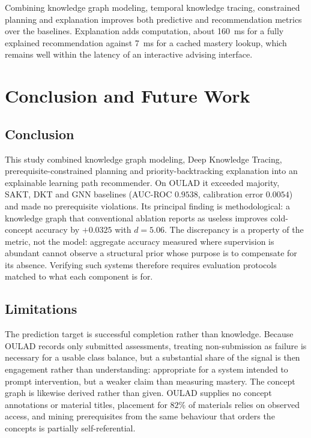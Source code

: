 \documentclass[graybox]{SNmult}
\begin{document}
Combining knowledge graph modeling, temporal knowledge tracing, constrained planning and
explanation improves both predictive and recommendation metrics over the baselines.
Explanation adds computation, about 160~ms for a fully explained recommendation against
7~ms for a cached mastery lookup, which remains well within the latency of an interactive
advising interface.

\section{Conclusion and Future Work}
\label{sec:conclusion}

\subsection{Conclusion}
\label{subsec:conclusion}

This study combined knowledge graph modeling, Deep Knowledge Tracing,
prerequisite-constrained planning and priority-backtracking explanation into an explainable
learning path recommender. On OULAD it exceeded majority, SAKT, DKT and GNN baselines
(AUC-ROC $0.9538$, calibration error $0.0054$) and made no prerequisite violations. Its
principal finding is methodological: a knowledge graph that conventional ablation reports as
useless improves cold-concept accuracy by $+0.0325$ with $d = 5.06$. The discrepancy is a
property of the metric, not the model: aggregate accuracy measured where supervision is
abundant cannot observe a structural prior whose purpose is to compensate for its absence.
Verifying such systems therefore requires evaluation protocols matched to what each
component is for.

\subsection{Limitations}
\label{subsec:limitations}

The prediction target is successful completion rather than knowledge. Because OULAD records
only submitted assessments, treating non-submission as failure is necessary for a usable
class balance, but a substantial share of the signal is then engagement rather than
understanding: appropriate for a system intended to prompt intervention, but a weaker claim
than measuring mastery. The concept graph is likewise derived rather than given. OULAD
supplies no concept annotations or material titles, placement for $82\%$ of materials
relies on observed access, and mining prerequisites from the same behaviour that orders
the concepts is partially self-referential.
\end{document}

